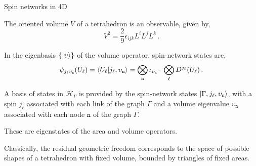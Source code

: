 \documentclass[12pt,titlepage]{article}
\begin{document}
\begin{frame}{Spin networks in 4D}
    \begin{list}{\,}{\leftmargin=1em \itemindent=0em}
        \item<1-> The oriented volume $V$ of a tetrahedron is an observable, given by,
        \begin{equation}
            V^2=\frac{2}{9}\epsilon_{ijk}L^i L^j L^k \,.
        \end{equation}
        \item<2-> In the eigenbasis $\{\ket{\upsilon}\}$ of the volume operator, spin-network states are,
        \begin{equation}
            \psi_{j_\ell \upsilon_\mathtt{n}}(U_\ell)= \braket{U_\ell}{j_\ell,\upsilon_\mathtt{n}}=\bigotimes_\mathtt{n}\iota_{\upsilon_\mathtt{n}}\cdot\,\bigotimes_\ell D^{j_\ell}(U_\ell)\,.
        \end{equation}
        \item<3-> A basis of states in $\mathcal{H}_\Gamma$ is provided by the spin-network states $\ket{\Gamma,j_\ell,\upsilon_\mathtt{n}}$, with a spin $j_\ell$ associated with each link of the graph $\Gamma$ and a volume eigenvalue $\upsilon_\mathtt{n}$ associated with each node $\mathtt{n}$ of the graph $\Gamma$.
        \item<4-> These are eigenstates of the area and volume operators.
        \item<5-> Classically, the residual geometric freedom corresponds to the space of possible shapes of a tetrahedron with fixed volume, bounded by triangles of fixed areas.
    \end{list}
\end{frame}

\end{document}
